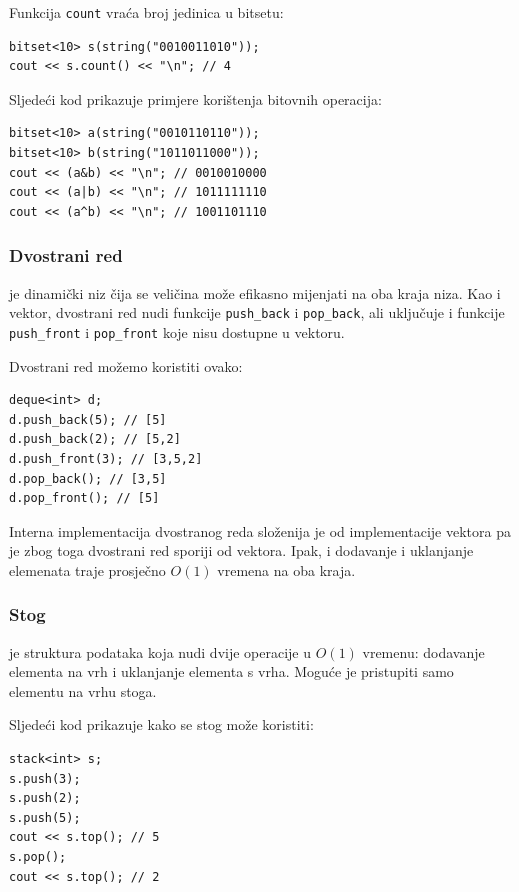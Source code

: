 Funkcija \texttt{count} vraća broj
jedinica u bitsetu:

\begin{lstlisting}
bitset<10> s(string("0010011010"));
cout << s.count() << "\n"; // 4
\end{lstlisting}

Sljedeći kod prikazuje primjere korištenja bitovnih operacija:
\begin{lstlisting}
bitset<10> a(string("0010110110"));
bitset<10> b(string("1011011000"));
cout << (a&b) << "\n"; // 0010010000
cout << (a|b) << "\n"; // 1011111110
cout << (a^b) << "\n"; // 1001101110
\end{lstlisting}

\subsubsection{Dvostrani red}


 je dinamički niz
čija se veličina može efikasno
mijenjati na oba kraja niza.
Kao i vektor, dvostrani red nudi funkcije
\texttt{push\_back} i \texttt{pop\_back}, ali
uključuje i funkcije
\texttt{push\_front} i \texttt{pop\_front}
koje nisu dostupne u vektoru.

Dvostrani red možemo koristiti ovako:
\begin{lstlisting}
deque<int> d;
d.push_back(5); // [5]
d.push_back(2); // [5,2]
d.push_front(3); // [3,5,2]
d.pop_back(); // [3,5]
d.pop_front(); // [5]
\end{lstlisting}

Interna implementacija dvostranog reda
složenija je od implementacije vektora
pa je zbog toga dvostrani red sporiji od vektora.
Ipak, i dodavanje i uklanjanje
elemenata traje prosječno $O(1)$ vremena na oba kraja.

\subsubsection{Stog}


je struktura podataka koja nudi dvije
operacije u $O(1)$ vremenu:
dodavanje elementa na vrh
i uklanjanje elementa s vrha.
Moguće je pristupiti samo elementu
na vrhu stoga.

Sljedeći kod prikazuje kako se stog može koristiti:
\begin{lstlisting}
stack<int> s;
s.push(3);
s.push(2);
s.push(5);
cout << s.top(); // 5
s.pop();
cout << s.top(); // 2
\end{lstlisting}
